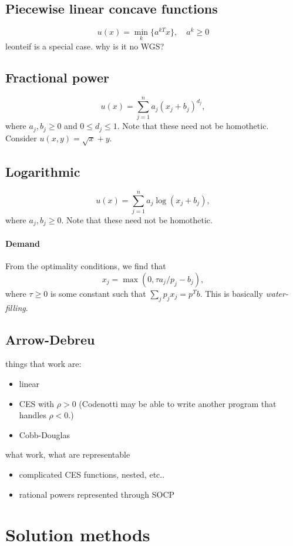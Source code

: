 \documentclass{article}
\begin{document}
\subsection{Piecewise linear concave functions}
\[
u(x) = \min_k\lbrace a^{kT}x \rbrace,\quad a^k \geq 0
\]
leonteif is a special case. why is it no WGS?

\subsection{Fractional power}
 \[
 u(x) = \sum_{j=1}^n a_j (x_j+ b_j)^{d_j},
 \]
 where $a_j, b_j \geq 0$ and $0 \leq d_j \leq 1$.
 Note that these need not be homothetic. Consider $u(x,y) = \sqrt{x} + y$.

\subsection{Logarithmic}
\[
u(x) = \sum_{j=1}^n a_j \log(x_j+ b_j),
\]
where $a_j, b_j \geq 0$.  Note that these need not be homothetic.

\paragraph{Demand}
From the optimality conditions, we find that
\[
x_j = \max(0, \tau a_j/p_j - b_j),
\]
where $\tau \geq 0$ is some constant such that $\sum_j p_j x_j = p^Tb$. 
This is basically \emph{water-filling}.



\subsection{Arrow-Debreu}
things that work are:
\begin{itemize}
\item linear
\item CES with $\rho > 0$ (Codenotti may be able to write another program that handles $\rho < 0$.)
\item Cobb-Douglas
\end{itemize}
what work, what are representable
\begin{itemize}
\item complicated CES functions, nested, etc..
\item rational powers represented through SOCP
\end{itemize}

\section{Solution methods}
\end{document}
